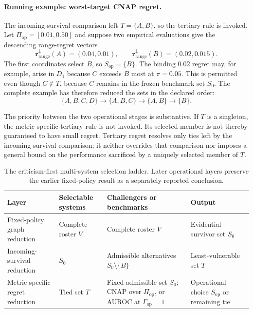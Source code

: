\documentclass[11pt]{article}
\theoremstyle{remark}
\begin{document}
\paragraph{Running example: worst-target CNAP regret.}
The incoming-survival comparison left $T=\{A,B\}$, so the tertiary rule is
invoked. Let $\Pi_{\mathrm{op}}=[0.01,0.50]$ and suppose two empirical
evaluations give the descending range-regret vectors
\[
\mathbf r_{\mathrm{range}}^{\downarrow}(A)=(0.04,0.01),
\qquad
\mathbf r_{\mathrm{range}}^{\downarrow}(B)=(0.02,0.015).
\]
The first coordinates select $B$, so $S_{\mathrm{op}}=\{B\}$. The binding
$0.02$ regret may, for example, arise in $D_1$ because $C$ exceeds $B$ most at
$\pi=0.05$. This is permitted even though $C\notin T$, because $C$ remains in
the frozen benchmark set $S_0$. The complete example has therefore reduced the
sets in the declared order:
\[
\{A,B,C,D\}
\longrightarrow
\{A,B,C\}
\longrightarrow
\{A,B\}
\longrightarrow
\{B\}.
\]

The priority between the two operational stages is substantive. If $T$ is a
singleton, the metric-specific tertiary rule is not invoked. Its selected member is
not thereby guaranteed to have small regret. Tertiary regret resolves
only ties left by the incoming-survival comparison; it neither overrides that
comparison nor imposes a general bound on the performance sacrificed by a
uniquely selected member of $T$.

\begin{table}[H]
\centering
\caption{The criticism-first multi-system selection ladder. Later operational
layers preserve the earlier fixed-policy result as a separately reported
conclusion.}
\label{tab:operational-selection-ladder}
\small
\begin{tabularx}{\textwidth}{@{}>{\raggedright\arraybackslash}p{}>{\raggedright\arraybackslash}p{}>{\raggedright\arraybackslash}X>{\raggedright\arraybackslash}p{}@{}}
\toprule
Layer & Selectable systems & Challengers or benchmarks & Output \\
\midrule
Fixed-policy graph reduction & Complete roster $V$ & Complete roster $V$ & Evidential survivor set $S_0$ \\
Incoming-survival reduction & $S_0$ & Admissible alternatives $S_0\setminus\{B\}$ & Least-vulnerable set $T$ \\
Metric-specific regret reduction & Tied set $T$ & Fixed admissible set $S_0$; CNAP over $\Pi_{\mathrm{op}}$, or AUROC at $\Gamma_{\mathrm{op}}=1$ & Operational choice $S_{\mathrm{op}}$ or remaining tie \\
\bottomrule
\end{tabularx}
\end{table}
\end{document}
